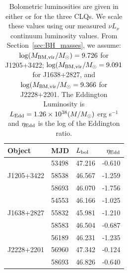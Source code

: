 \documentclass[fleqn,usenatbib]{mnras}
\begin{document}
\begin{table}
  \centering
  \begin{tabular}{l l l r}
    \hline
    \hline
    Object           & MJD      & $L_{\rm bol}$    &  $\eta_{\rm Edd}$  \\
    \hline
                     & 53498    & 47.216           &  -0.610                  \\
J1205+3422 & 58538    &  46.567          &  -1.259  \\                        %
                     & 58693     &  46.070         &  -1.756 \\
    \hline 
                     & 54553   & 46.166    & -1.025 \\
J1638+2827  & 55832   & 45.981    & -1.210  \\                                            %
                     & 58583   & 46.504   & -0.687       \\
    \hline 
                      & 56189   & 46.231   &  -1.235 \\
J2228+2201   & 56960    & 47.342   & -0.124 \\                                             %
                       & 58693   & 46.826     &  -0.640 \\
    \hline
    \hline
  \end{tabular}
  \caption{
    Bolometric luminosities are given in either \citet{Shen2011} or 
    \citet{Kozlowski2017} for the three CLQs. We scale these 
    values using our measured $\nu L_{\nu}$ continuum luminosity values.
    From Section~\ref{sec:BH_masses}, we assume: $\log(M_{\rm BM, vir}/M_{\odot}) = 9.726$ for J1205+3422; 
    $\log(M_{\rm BM, vir}/M_{\odot} = 9.091$ for  J1638+2827, 
    and $\log(M_{\rm BM, vir}/M_{\odot} = 9.366$ for J2228+2201. 
    The Eddington Luminosity is 
    $L_{\rm Edd} = 1.26\times10^{38} (M/M_{\odot})$ erg s$^{-1}$ and
   $\eta_{\rm Edd}$ is the log of the Eddington ratio.}
\label{tab:Eddington_ratios} 
\end{table}
\end{document}
